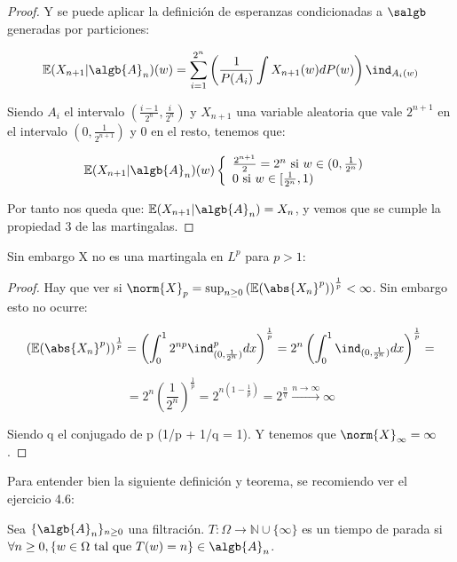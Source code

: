 \documentclass{apuntes}
\begin{document}
\begin{example}
\begin{proof}
Y se puede aplicar la definición de esperanzas condicionadas a $\salgb$ generadas por particiones:

\[
\mathbb{E}(X_{n+1}|\algb{A}_n)(w)=\sum_{i=1}^{2^n}\left( \frac{1}{P(A_i)}\int X_{n+1}(w)dP(w)\right)\ind_{A_i(w)}
\]

Siendo $A_i$ el intervalo $(\frac{i-1}{2^n}, \frac{i}{2^n})$ y $X_{n+1}$ una variable aleatoria que vale $2^{n+1}$ en el intervalo $(0, \frac{1}{2^{n+1}})$ y 0 en el resto, tenemos que:

$$
\mathbb{E}(X_{n+1}|\algb{A}_n)(w)
  \left\lbrace
  \begin{array}{l}
     \frac{2^{n+1}}{2}=2^n \text{ si } w \in (0,\frac{1}{2^n}) \\
     0 \text{ si } w \in [\frac{1}{2^n}, 1) \\
  \end{array}
  \right. \text{   }
$$

Por tanto nos queda que: $\mathbb{E}(X_{n+1}|\algb{A}_n)=X_n$, y vemos que se cumple la propiedad 3 de las martingalas.

\end{proof}

Sin embargo X no es una martingala en $L^p$ para $p>1$:
\begin{proof}
Hay que ver si $\norm{X}_p = \sup_{n\geq 0}\left(\mathbb{E}(\abs{X_n}^p) \right)^\frac{1}{p} < \infty$. Sin embargo esto no ocurre:

\[
\left(\mathbb{E}(\abs{X_n}^p) \right)^\frac{1}{p} = \left(\int_{0}^{1} 2^{np} \ind_{(0,\frac{1}{2^n})}^p dx\right)^\frac{1}{p} = 2^n \left(\int_{0}^{1} \ind_{(0,\frac{1}{2^n})} dx\right)^\frac{1}{p} = 
\]

\[
= 2^n \left( \frac{1}{2^n} \right)^\frac{1}{p} = 2^{n(1-\frac{1}{p})} = 2^{\frac{n}{q}} \stackrel{n \rightarrow \infty}{\rightarrow} \infty
\]

Siendo q el conjugado de p (1/p + 1/q = 1). Y tenemos que $\norm{X}_{\infty} = \infty$.
\end{proof}

\end{example}

Para entender bien la siguiente definición y teorema, se recomiendo ver el ejercicio 4.6:

\begin{defn}
Sea $\{\algb{A}_n \}_{n \geq 0}$ una filtración. $T: \Omega \rightarrow \mathbb{N}\cup \{\infty \}$ es un tiempo de parada si $\forall n \geq 0, \{w \in \Omega \text{ tal que } T(w)=n\} \in \algb{A}_n$.
\end{defn}
\end{document}
